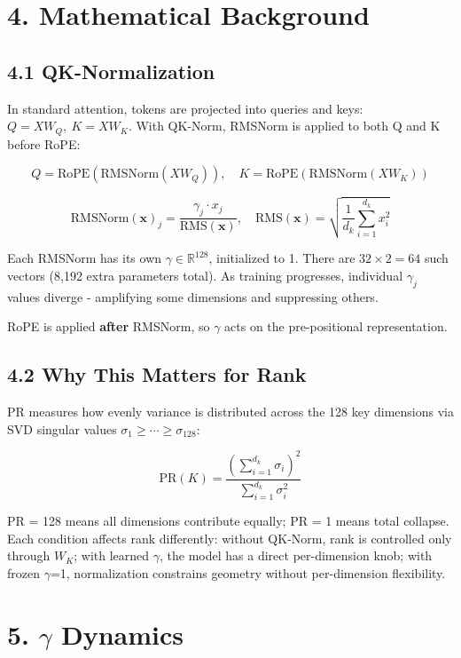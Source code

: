 \documentclass[11pt]{article}
\begin{document}
\section{4. Mathematical Background}

\subsection{4.1 QK-Normalization}

In standard attention, tokens are projected into queries and keys: $Q = XW_Q,\ K = XW_K$. With QK-Norm, RMSNorm is applied to both Q and K before RoPE:

$$Q = \text{RoPE}\!\left(\text{RMSNorm}(XW_Q)\right), \quad K = \text{RoPE}\!\left(\text{RMSNorm}(XW_K)\right)$$

$$\text{RMSNorm}(\mathbf{x})_j = \frac{\gamma_j \cdot x_j}{\text{RMS}(\mathbf{x})}, \quad \text{RMS}(\mathbf{x}) = \sqrt{\frac{1}{d_k}\sum_{i=1}^{d_k} x_i^2}$$

Each RMSNorm has its own $\gamma \in \mathbb{R}^{128}$, initialized to 1. There are $32 \times 2 = 64$ such vectors (8,192 extra parameters total). As training progresses, individual $\gamma_j$ values diverge - amplifying some dimensions and suppressing others.

RoPE is applied \textbf{after} RMSNorm, so $\gamma$ acts on the pre-positional representation.

\subsection{4.2 Why This Matters for Rank}

PR measures how evenly variance is distributed across the 128 key dimensions via SVD singular values $\sigma_1 \geq \cdots \geq \sigma_{128}$:

$$\text{PR}(K) = \frac{\left(\sum_{i=1}^{d_k} \sigma_i\right)^2}{\sum_{i=1}^{d_k} \sigma_i^2}$$

PR = 128 means all dimensions contribute equally; PR = 1 means total collapse. Each condition affects rank differently: without QK-Norm, rank is controlled only through $W_K$; with learned $\gamma$, the model has a direct per-dimension knob; with frozen $\gamma$=1, normalization constrains geometry without per-dimension flexibility.

\section{5. $\gamma$ Dynamics}
\end{document}
